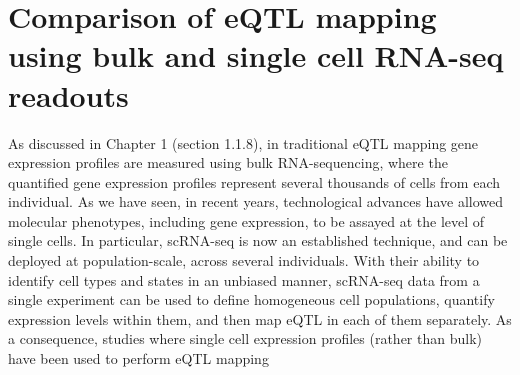 
\chapter{Comparison of eQTL mapping using bulk and single cell RNA-seq readouts}
\label{chapter3}

As discussed in Chapter 1 (section 
1.1.8), 
in traditional 
eQTL
mapping gene expression profiles are measured using bulk RNA-sequencing, where 
the quantified gene expression profiles represent
several thousands of cells from each individual.
As we have seen, in recent years, technological advances 
have allowed molecular phenotypes, including gene expression, to be assayed at the level of single cells.
In particular, 
scRNA-seq
is now an established technique, 
and can be deployed at population-scale, across several individuals.
With their ability to identify cell types and states in an unbiased manner,
scRNA-seq
data from a single experiment can be used to define homogeneous cell populations, quantify expression levels within them, and then map eQTL in each of them separately.
As a consequence, studies where single cell expression profiles (rather than bulk) have been used to perform
eQTL
mapping 
